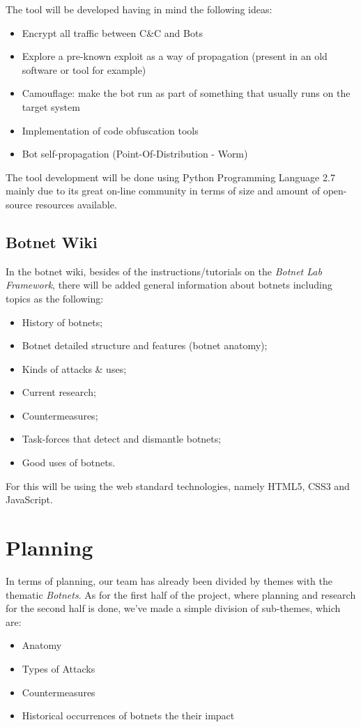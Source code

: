 \documentclass[]{article}
\begin{document}
The tool will be developed having in mind the following ideas:
\begin{itemize}
	\item Encrypt all traffic between C\&C and Bots
	\item Explore a pre-known exploit as a way of propagation (present in an old software or tool for example)
	\item Camouflage: make the bot run as part of something that usually runs on the target system
	\item Implementation of code obfuscation tools
	\item Bot self-propagation (Point-Of-Distribution - Worm)
\end{itemize}

The tool development will be done using Python Programming Language 2.7 \cite{app:python} mainly due to its great  on-line community in terms of size and amount of open-source resources available.

\subsection{Botnet Wiki}

In the botnet wiki, besides of the instructions/tutorials on the \textit{Botnet Lab Framework}, there will be added general information about botnets including topics as the following:
\begin{itemize}
	\item History of botnets;
	\item Botnet detailed structure and features (botnet anatomy);
	\item Kinds of attacks \& uses;
	\item Current research;
	\item Countermeasures;
	\item Task-forces that detect and dismantle botnets;
	\item Good uses of botnets.
\end{itemize}

For this will be using the web standard technologies, namely HTML5, CSS3 and JavaScript.

\section{Planning}

In terms of planning, our team has already been divided by themes with the thematic \textit{Botnets}. As for the first half of the project, where planning and research for the second half is done, we've made a simple division of sub-themes, which are:
\begin{itemize}
\item Anatomy
\item Types of Attacks
\item Countermeasures
\item Historical occurrences of botnets the their impact
\end{itemize} 
\end{document}
